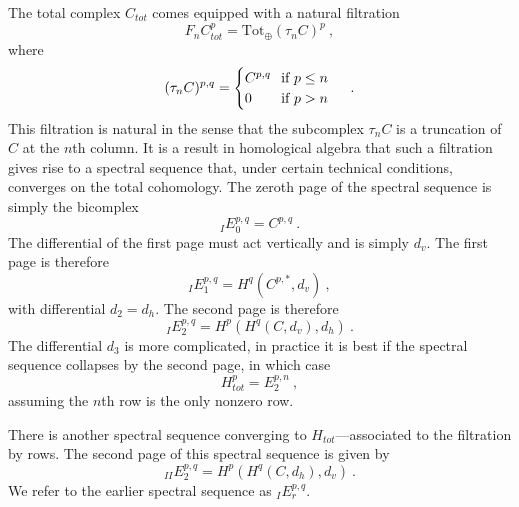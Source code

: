 \documentclass[a4paper]{article}
\begin{document}
The total complex $C_{tot}$ comes equipped with a natural filtration
\begin{equation}
	 F_nC_{tot}^p = \mathrm{Tot}_\oplus(\tau_n C)^p~,
\end{equation}
where
\begin{equation}
	(\tau_n C)^{p,q} =
	\begin{cases}
	\makebox[0.8cm][l]{$C^{p,q}$}\text{ if }p\le n\\
	\makebox[0.8cm][l]{$0$} \text{ if }p>n
	\end{cases}~.
\end{equation}
This filtration is natural in the sense that the subcomplex $\tau_n C$ is a truncation of $C$ at the $n$th column. It is a result in homological algebra that such a filtration gives rise to a spectral sequence that, under certain technical conditions, converges on the total cohomology. The zeroth page of the spectral sequence is simply the bicomplex
\begin{equation}
	_I E_0^{p,q} = C^{p,q}~.
\end{equation}
The differential of the first page must act vertically and is simply $d_v$. The first page is therefore
\begin{equation}
	_I E_1^{p,q} = H^q(C^{p,\ast},d_v)~,
\end{equation}
with differential $d_2 = d_h$. The second page is therefore
\begin{equation}
	_I E_2^{p,q} = H^p(H^q(C,d_v),d_h)~.
\end{equation}
The differential $d_3$ is more complicated, in practice it is best if the spectral sequence collapses by the second page, in which case
\begin{equation}
	H_{tot}^p = E^{p,n}_2~,
\end{equation}
assuming the $n$th row is the only nonzero row.

There is another spectral sequence converging to $H_{tot}$---associated to the filtration by rows. The second page of this spectral sequence is given by
\begin{equation}
	_{II} E_2^{p,q} = H^p(H^q(C,d_h),d_v)~.
\end{equation}
We refer to the earlier spectral sequence as $_I E^{p,q}_r$.
\end{document}

